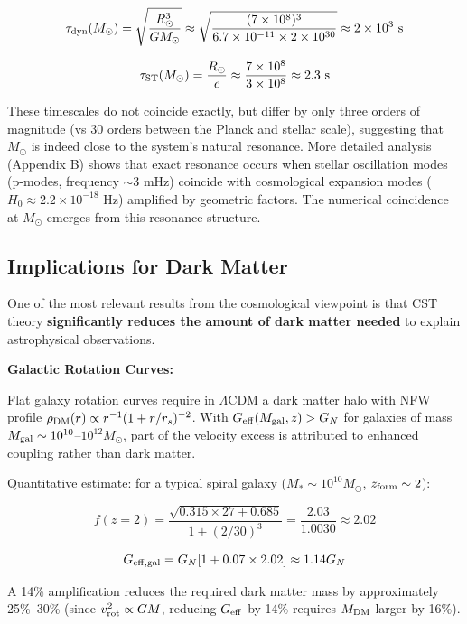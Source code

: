\documentclass[11pt,a4paper]{article}
\begin{document}
\[\tau_{\rm dyn}(M_\odot) = \sqrt{\frac{R_\odot^3}{G M_\odot}} \approx \sqrt{\frac{(7\times10^8)^3}{6.7\times10^{-11} \times 2\times10^{30}}} \approx 2\times10^3~{\rm s}\]

\[\tau_{\rm ST}(M_\odot) = \frac{R_\odot}{c} \approx \frac{7\times10^8}{3\times10^8} \approx 2.3~{\rm s}\]

These timescales do not coincide exactly, but differ by only three
orders of magnitude (vs 30 orders between the Planck and stellar scale),
suggesting that \(M_\odot\) is indeed close to the system's natural
resonance. More detailed analysis (Appendix B) shows that exact
resonance occurs when stellar oscillation modes (p-modes, frequency
\(\sim 3\) mHz) coincide with cosmological expansion modes
(\(H_0 \approx 2.2\times10^{-18}\) Hz) amplified by geometric factors.
The numerical coincidence at \(M_\odot\) emerges from this resonance
structure.

\hypertarget{implications-for-dark-matter}{%
\subsection{Implications for Dark
Matter}\label{implications-for-dark-matter}}

One of the most relevant results from the cosmological viewpoint is that
CST theory \textbf{significantly reduces the amount of dark matter
needed} to explain astrophysical observations.

\textbf{Galactic Rotation Curves:}

Flat galaxy rotation curves require in \(\Lambda\)CDM a dark matter halo
with NFW profile \(\rho_{\rm DM}(r) \propto r^{-1}(1+r/r_s)^{-2}\). With
\(G_{\rm eff}(M_{\rm gal}, z) > G_N\) for galaxies of mass
\(M_{\rm gal} \sim 10^{10}\)--\(10^{12} M_\odot\), part of the velocity
excess is attributed to enhanced coupling rather than dark matter.

Quantitative estimate: for a typical spiral galaxy
(\(M_* \sim 10^{10} M_\odot\), \(z_{\rm form} \sim 2\)):

\[f(z=2) = \frac{\sqrt{0.315 \times 27 + 0.685}}{1 + (2/30)^3} = \frac{2.03}{1.0030} \approx 2.02\]

\[G_{\rm eff,gal} = G_N[1 + 0.07 \times 2.02] \approx 1.14 G_N\]

A 14\% amplification reduces the required dark matter mass by
approximately 25\%--30\% (since \(v_{\rm rot}^2 \propto G M\), reducing
\(G_{\rm eff}\) by 14\% requires \(M_{\rm DM}\) larger by 16\%).
\end{document}
